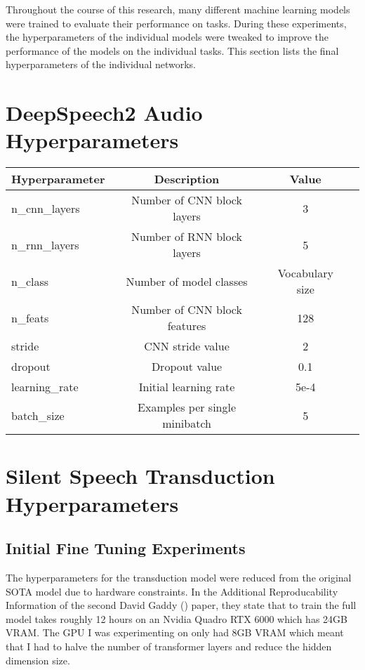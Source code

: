 Throughout the course of this research, many different machine learning models were
trained to evaluate their performance on tasks. During these experiments,
the hyperparameters of the individual models were tweaked to improve the performance of
the models on the individual tasks. This section lists the final hyperparameters of
the individual networks.

\section{DeepSpeech2 Audio Hyperparameters}


{\small\begin{center}
\begin{tabular} { | l | c | c | c | }
\hline
Hyperparameter & Description & Value \\
\hline
n\_cnn\_layers & Number of CNN block layers & 3 \\
n\_rnn\_layers & Number of RNN block layers & 5 \\
n\_class & Number of model classes & Vocabulary size \\
n\_feats & Number of CNN block features & 128 \\
stride & CNN stride value & 2 \\
dropout & Dropout value & 0.1 \\
learning\_rate & Initial learning rate & 5e-4 \\
batch\_size & Examples per single minibatch & 5 \\
\hline
\end{tabular}
\end{center}}

\section{Silent Speech Transduction Hyperparameters}

\subsection{Initial Fine Tuning Experiments}

The hyperparameters for the transduction model were reduced from the original
SOTA model due to hardware constraints. In the Additional Reproducability
Information of the second David Gaddy (\cite{gaddy2021improved}) paper, they state
that to train the full model takes roughly 12 hours on an Nvidia Quadro RTX 6000
which has 24GB VRAM. The GPU I was experimenting on only had 8GB VRAM which meant
that I had to halve the number of transformer layers and reduce the hidden dimension
size.

